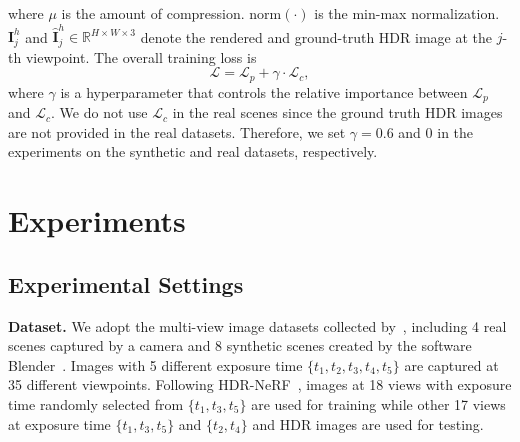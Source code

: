 \documentclass{article}
\begin{document}
where $\mu$ is the amount of compression. $\text{norm}(\cdot)$ is the min-max normalization. $\mathbf{I}_j^h$ and $\hat{\mathbf{I}}_j^h \in \mathbb{R}^{H \times W\times 3}$ denote the rendered and ground-truth HDR image at the $j$-th viewpoint. The overall training loss is
\begin{equation}
    \mathcal{L} = \mathcal{L}_p + \gamma \cdot \mathcal{L}_c,
    \label{eq:loss_total}
\end{equation}
where $\gamma$ is a hyperparameter that controls the relative importance between $\mathcal{L}_p$ and $\mathcal{L}_c$. We do not use $\mathcal{L}_c$ in the real scenes since the ground truth HDR images are not provided in the real datasets. Therefore, we set $\gamma = 0.6$ and $0$ in the experiments on the synthetic and real datasets, respectively. %

\section{Experiments}
\label{sec:exp}

\subsection{Experimental Settings}
\label{sec:exp_setup}

\noindent\textbf{Dataset.} We adopt the multi-view image datasets collected by~\cite{hdr_nerf}, including 4 real scenes captured by a camera and 8 synthetic scenes created by the software Blender~\cite{blender}. Images with 5 different exposure time $\{t_1, t_2, t_3, t_4, t_5\}$ are captured at 35 different viewpoints. Following HDR-NeRF~\cite{hdr_nerf}, images at 18 views with exposure time randomly selected from $\{t_1, t_3, t_5\}$ are used for training while other 17 views at exposure time $\{t_1, t_3, t_5\}$ and $\{t_2, t_4\}$ and HDR images are used for testing. %
\end{document}
